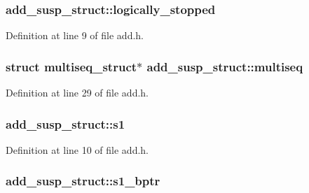 \subsubsection[{\texorpdfstring{logically\+\_\+stopped}{logically_stopped}}]{ add\+\_\+susp\+\_\+struct\+::logically\+\_\+stopped}\hypertarget{structadd__susp__struct_a6c8d8cbea2cb15d5e496a5ef8be8d955}{}\label{structadd__susp__struct_a6c8d8cbea2cb15d5e496a5ef8be8d955}


Definition at line 9 of file add.\+h.

\subsubsection[{\texorpdfstring{multiseq}{multiseq}}]{\setlength{\rightskip}{0pt plus 5cm}struct {\bf multiseq\+\_\+struct}$\ast$ add\+\_\+susp\+\_\+struct\+::multiseq}\hypertarget{structadd__susp__struct_a93d74bb0c9caf29070bf7100adda5925}{}\label{structadd__susp__struct_a93d74bb0c9caf29070bf7100adda5925}


Definition at line 29 of file add.\+h.

\subsubsection[{\texorpdfstring{s1}{s1}}]{ add\+\_\+susp\+\_\+struct\+::s1}\hypertarget{structadd__susp__struct_a5696de2072e6f0c7500a1d9e9f00d4ed}{}\label{structadd__susp__struct_a5696de2072e6f0c7500a1d9e9f00d4ed}


Definition at line 10 of file add.\+h.

\subsubsection[{\texorpdfstring{s1\+\_\+bptr}{s1_bptr}}]{ add\+\_\+susp\+\_\+struct\+::s1\+\_\+bptr}\hypertarget{structadd__susp__struct_a335718d2ab9af67d1b091ce9da057c59}{}\label{structadd__susp__struct_a335718d2ab9af67d1b091ce9da057c59}


